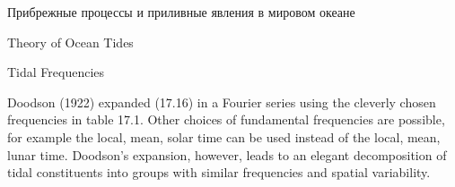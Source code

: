\begin{chapter}{Прибрежные процессы и приливные явления в мировом океане}
\begin{section}{Theory of Ocean Tides}
\begin{paragraph}{Tidal Frequencies}

Doodson (1922) expanded (17.16) in a Fourier series using the cleverly
chosen frequencies in table 17.1. Other choices of fundamental
frequencies are possible, for example the local, mean, solar time can
be used instead of the local, mean, lunar time. Doodson's expansion,
however, leads to an elegant decomposition of tidal constituents into
groups with similar frequencies and spatial variability.
%


\end{paragraph}
\end{section}
\end{chapter}
